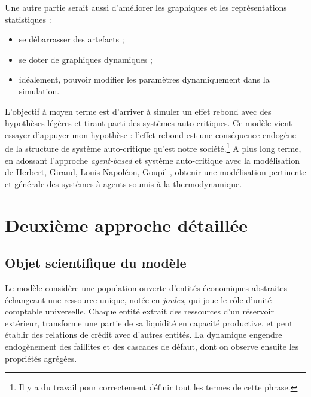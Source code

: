 \documentclass[10pt,a4paper]{article}
\begin{document}
Une autre partie serait aussi d'améliorer les graphiques et les représentations statistiques :
\begin{itemize}
\item se débarrasser des artefacts ;
\item se doter de graphiques dynamiques ;
\item idéalement, pouvoir modifier les paramètres dynamiquement dans la simulation.
\end{itemize}

L'objectif à moyen terme est d'arriver à simuler un effet rebond avec des hypothèses légères et tirant parti des systèmes auto-critiques. Ce modèle vient essayer d'appuyer mon hypothèse : l'effet rebond est une conséquence endogène de la structure de système auto-critique qu'est notre société.\footnote{Il y a du travail pour correctement définir tout les termes de cette phrase.} A plus long terme, en adossant l'approche \textit{agent-based} et système auto-critique avec la modélisation de Herbert, Giraud, Louis-Napoléon, Goupil \cite{herbert2022}, obtenir une modélisation pertinente et générale des systèmes à agents soumis à la thermodynamique.  
\section{Deuxième approche détaillée}


\subsection{Objet scientifique du modèle}

Le modèle considère une population ouverte d'entités économiques abstraites échangeant une ressource unique, notée en \emph{joules}, qui joue le rôle d'unité comptable universelle. Chaque entité extrait des ressources d'un réservoir extérieur, transforme une partie de sa liquidité en capacité productive, et peut établir des relations de crédit avec d'autres entités. La dynamique engendre endogènement des faillites et des cascades de défaut, dont on observe ensuite les propriétés agrégées.
\end{document}

